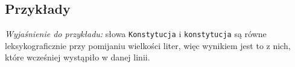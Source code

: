 \documentclass{sinol}
\begin{document}
\begin{tasktext}
\medskip

\section{Przykłady}


%

\textit{Wyjaśnienie do przykładu:} słowa \texttt{Konstytucja} i \texttt{konstytucja} są równe leksykograficznie przy pomijaniu wielkości liter, więc wynikiem jest to z nich, które wcześniej wystąpiło w danej linii.

\end{tasktext}
\end{document}
